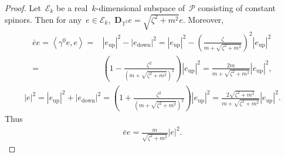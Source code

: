 \documentclass[11pt,final]{amsart}
\newcommand{\T}{\mathbb{T}}
\newcommand{\pD}{\mathbf{D}}
\newcommand{\Abracket}[1]{\left<#1\right>} %
\newcommand{\parenthesis}[1]{\left(#1\right)} %
\DeclareMathOperator{\up}{up}
\DeclareMathOperator{\down}{down}
\begin{document}
\begin{proof}
Let~$\mathscr{E}_k$ be a real~$k$-dimensional subspace of~$\mathscr{P}$ consisting of constant spinors.
Then for any~$e\in\mathscr{E}_k$,~$\pD_{\T^2} e=\sqrt{\zeta^2+ m^2} e$.
Moreover,
\begin{align}
    \bar{e}e = \Abracket{\gamma^0 e, e}
    =& |e_{\up}|^2 - |e_{\down}|^2
    = |e_{\up}|^2 - \parenthesis{ \frac{\zeta}{m+\sqrt{\zeta^2+m^2}} }^2 |e_{\up}|^2 \\
    =&\parenthesis{  1 - \frac{\zeta^2}{(m+\sqrt{\zeta^2+m^2})^2} } |e_{\up}|^2
    = \frac{2 m}{m+\sqrt{\zeta^2+m^2}} |e_{\up}|^2,
\end{align}
\begin{align}
    |e|^2=|e_{\up}|^2 +|e_{\down}|^2
    =\parenthesis{  1 + \frac{\zeta^2}{(m+\sqrt{\zeta^2+m^2})^2} } |e_{\up}|^2
    =\frac{2\sqrt{\zeta^2+m^2}}{m+\sqrt{\zeta^2+m^2}}|e_{\up}|^2.
\end{align}
Thus
\begin{align}
    \bar{e}e = \frac{m}{\sqrt{\zeta^2 + m^2}} |e|^2.
\end{align}


\end{proof}
\end{document}
